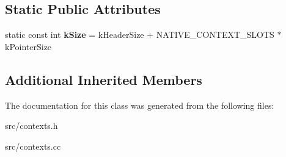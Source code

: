\subsection*{Static Public Attributes}
\begin{DoxyCompactItemize}
\item 
\hypertarget{classv8_1_1internal_1_1_context_a52fad0297ec32fa9316e57396873d347}{}static const int {\bfseries k\+Size} = k\+Header\+Size + N\+A\+T\+I\+V\+E\+\_\+\+C\+O\+N\+T\+E\+X\+T\+\_\+\+S\+L\+O\+T\+S $\ast$ k\+Pointer\+Size\label{classv8_1_1internal_1_1_context_a52fad0297ec32fa9316e57396873d347}

\end{DoxyCompactItemize}
\subsection*{Additional Inherited Members}


The documentation for this class was generated from the following files\+:\begin{DoxyCompactItemize}
\item 
src/contexts.\+h\item 
src/contexts.\+cc\end{DoxyCompactItemize}
